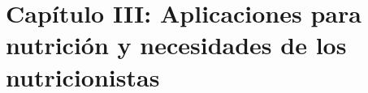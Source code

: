 \newpage
\section{Capítulo III: Aplicaciones para nutrición y necesidades de los nutricionistas}
\label{cap3}


